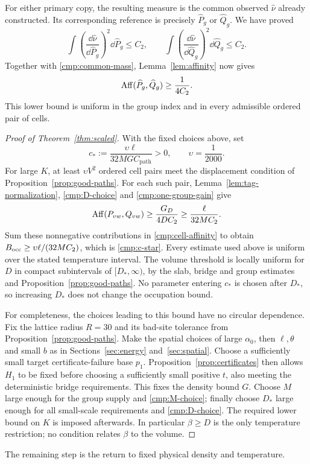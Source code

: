 For either primary copy, the resulting measure is the common observed
$\widehat\nu$ already constructed. Its corresponding reference is precisely
$\widehat P_g$ or $\widehat Q_g$. We have proved
\begin{equation}\label{cmp:observed-second-moments}
 \int\left(\frac{\dd\widehat\nu}{\dd\widehat P_g}\right)^2
                \dd\widehat P_g\le C_2,
 \qquad
 \int\left(\frac{\dd\widehat\nu}{\dd\widehat Q_g}\right)^2
                \dd\widehat Q_g\le C_2.
\end{equation}
Together with \eqref{cmp:common-mass}, Lemma~\ref{lem:affinity} now gives
\begin{equation}\label{cmp:one-group-gain}
 \operatorname{Aff}(\widehat P_g,\widehat Q_g)\ge\frac1{4C_2}.
\end{equation}
This lower bound is uniform in the group index and in every admissible
ordered pair of cells.

\begin{proof}[Proof of Theorem~\ref{thm:scaled}]
With the fixed choices above, set
\begin{equation}\label{cmp:c-star}
 c_*:=\frac{\upsilon\ell}{32M G C_{\mathrm{path}}}>0,
 \qquad \upsilon=\frac1{2000}.
\end{equation}
For large $K$, at least $\upsilon V^2$ ordered cell pairs meet the displacement
condition of Proposition~\ref{prop:good-paths}. For each such pair,
Lemma~\ref{lem:tag-normalization}, \eqref{cmp:D-choice} and
\eqref{cmp:one-group-gain} give
\[
 \operatorname{Aff}(P_{vw},Q_{vw})
 \ge\frac{G_D}{4D C_2}
 \ge\frac\ell{32M C_2}.
\]
Sum these nonnegative contributions in \eqref{cmp:cell-affinity} to obtain
$B_{\rm occ}\ge\upsilon\ell/(32M C_2)$, which is \eqref{cmp:c-star}.
Every estimate used above is uniform over the stated temperature interval.
The volume threshold is locally uniform for $D$ in compact subintervals
of $[D_*,\infty)$, by the slab, bridge and group estimates and
Proposition~\ref{prop:good-paths}. No parameter entering $c_*$ is chosen
after $D_*$, so increasing $D_*$ does not change the occupation bound.

For completeness, the choices leading to this bound have no circular
dependence. Fix the lattice radius $R=30$ and its bad-site tolerance from
Proposition~\ref{prop:good-paths}. Make the spatial choices of large
$\alpha_0$, then $\ell,\theta$ and small $b$ as in
Sections~\ref{sec:energy} and~\ref{sec:spatial}. Choose a sufficiently
small target certificate-failure base $p_1$. Proposition~\ref{prop:certificates}
then allows $H_1$ to be fixed before choosing a sufficiently small
positive $t$, also meeting the deterministic bridge requirements. This
fixes the density bound $G$. Choose $M$ large enough for the group supply
and \eqref{cmp:M-choice}; finally choose $D_*$ large enough for all
small-scale requirements and \eqref{cmp:D-choice}. The required lower
bound on $K$ is imposed afterwards. In particular $\beta\ge D$ is the
only temperature restriction; no condition relates $\beta$ to the volume.
\end{proof}

The remaining step is the return to fixed physical density and temperature.
